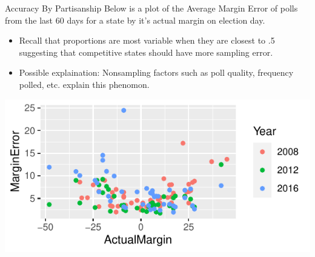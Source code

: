 \documentclass{beamer}\usepackage[]{graphicx}\usepackage[]{color}
\makeatletter
\def\maxwidth{ %
  \ifdim\Gin@nat@width>\linewidth
    \linewidth
  \else
    \Gin@nat@width
  \fi
}
\newenvironment{knitrout}{}{} %
\makeatother
\begin{document}
\begin{frame}{Accuracy By Partisanship}
Below is a plot of the Average Margin Error of polls from the last 60 days for a state by it's actual margin on election day. 
\begin{itemize}
\item Recall that proportions are most variable when they are closest to .5 suggesting that competitive states should have more sampling error.
\item Possible explaination: Nonsampling factors such as poll quality, frequency polled, etc.  explain this phenomon.
\end{itemize}
\begin{knitrout}
\color{fgcolor}
\includegraphics[width=\maxwidth]{figure/unnamed-chunk-3-1} 

\end{knitrout}

\end{frame}
\end{document}
